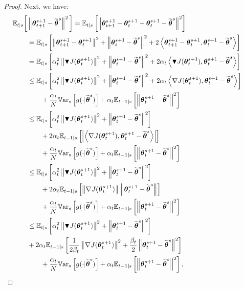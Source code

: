 \begin{proof}
	Next, we have:
	\begingroup
	\allowdisplaybreaks
	\begin{align}
	\mathbb{E}_{t|s}\bigg[ & \norm[]{\vtheta_{t+1}^{s+1}-\wt{\vtheta}^s}^2 \bigg]
	= \Ets{\norm[]{\vtheta_{t+1}^{s+1}- \vtheta_t^{s+1} + \vtheta_t^{s+1}-\wt{\vtheta}^s}^2} \nonumber\\
	&=\Ets{\norm[]{\vtheta_{t+1}^{s+1}-\vtheta_{t}^{s+1}}^2+\norm[]{\vtheta_t^{s+1}-\wt{\vtheta}^s}^2+2\dotprod{\vtheta_{t+1}^{s+1}-\vtheta_{t}^{s+1}}{\vtheta_t^{s+1}-\wt{\vtheta}^s}} \label{eq:14a} \\
	&= \Ets{\alpha_t^2\norm[]{\gradBlack{\vtheta_t^{s+1}}}^2+\norm[]{\vtheta_t^{s+1}-\wt{\vtheta}^s}^2+2\alpha_t\dotprod{\gradBlack{\vtheta_t^{s+1}}}{\vtheta_t^{s+1}-\wt{\vtheta}^s}} \label{eq:14}\\
	&\leq \Ets{\alpha_t^2\norm[]{\gradBlack{\vtheta_t^{s+1}}}^2+\norm[]{\vtheta_t^{s+1}-\wt{\vtheta}^s}^2+2\alpha_t\dotprod{\gradJ{\vtheta_t^{s+1}}}{\vtheta_t^{s+1}-\wt{\vtheta}^s}} \nonumber\\ 
	&\qquad+
	\frac{\alpha_t}{N}\Vars{g(\cdot\vert\wt{\vtheta}^s)} +\alpha_t\Ets[t-1]{\norm[]{\vtheta_t^{s+1}-\wt{\vtheta}^s}^2} \label{eq:15}\\
	&\leq \Ets{\alpha_t^2\norm[]{\gradBlack{\vtheta_t^{s+1}}}^2+\norm[]{\vtheta_t^{s+1}-\wt{\vtheta}^s}^2}\nonumber\\
	&\qquad+2\alpha_t\Ets[t-1]{\left|\dotprod{\gradJ{\vtheta_t^{s+1}}}{\vtheta_t^{s+1}-\wt{\vtheta}^s}\right|} \nonumber\\ 
	&\qquad+
	\frac{\alpha_t}{N}\Vars{g(\cdot\vert\wt{\vtheta}^s)} +\alpha_t\Ets[t-1]{\norm[]{\vtheta_t^{s+1}-\wt{\vtheta}^s}^2} \nonumber\\
	&\leq \Ets{\alpha_t^2\norm[]{\gradBlack{\vtheta_t^{s+1}}}^2+\norm[]{\vtheta_t^{s+1}-\wt{\vtheta}^s}^2}\nonumber\\
	&\qquad+2\alpha_t\Ets[t-1]{\norm[]{\gradJ{\vtheta_t^{s+1}}}\norm[]{\vtheta_t^{s+1}-\wt{\vtheta}^s}} \nonumber\\ 
	&\qquad+
	\frac{\alpha_t}{N}\Vars{g(\cdot\vert\wt{\vtheta}^s)} +\alpha_t\Ets[t-1]{\norm[]{\vtheta_t^{s+1}-\wt{\vtheta}^s}^2} \nonumber\\
	&\leq \Ets{\alpha_t^2\norm[]{\gradBlack{\vtheta_t^{s+1}}}^2+\norm[]{\vtheta_t^{s+1}-\wt{\vtheta}^s}^2}\nonumber\\ 
	&+2\alpha_t\Ets[t-1]{\frac{1}{2\beta_t}\norm[]{\gradJ{\vtheta_t^{s+1}}}^2+\frac{\beta_t}{2}\norm[]{\vtheta_t^{s+1}-\wt{\vtheta}^s}^2} \label{eq:16a}\\ 
	&\qquad
	+\frac{\alpha_t}{N}\Vars{g(\cdot\vert\wt{\vtheta}^s)} +\alpha_t\Ets[t-1]{\norm[]{\vtheta_t^{s+1}-\wt{\vtheta}^s}^2}, \label{eq:16}

\end{align}
\end{proof}

